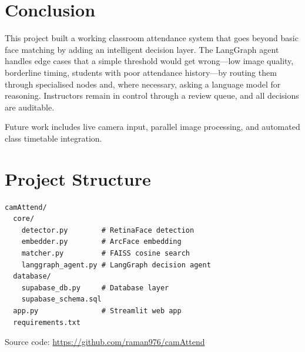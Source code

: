 \documentclass[conference]{IEEEtran}
\begin{document}
\section{Conclusion}

This project built a working classroom attendance system that goes beyond basic face matching by adding an intelligent decision layer. The LangGraph agent handles edge cases that a simple threshold would get wrong---low image quality, borderline timing, students with poor attendance history---by routing them through specialised nodes and, where necessary, asking a language model for reasoning. Instructors remain in control through a review queue, and all decisions are auditable.

Future work includes live camera input, parallel image processing, and automated class timetable integration.




\appendix
\section{Project Structure}

\begin{lstlisting}
camAttend/
  core/
    detector.py        # RetinaFace detection
    embedder.py        # ArcFace embedding
    matcher.py         # FAISS cosine search
    langgraph_agent.py # LangGraph decision agent
  database/
    supabase_db.py     # Database layer
    supabase_schema.sql
  app.py               # Streamlit web app
  requirements.txt
\end{lstlisting}

Source code: \url{https://github.com/raman976/camAttend}
\end{document}
